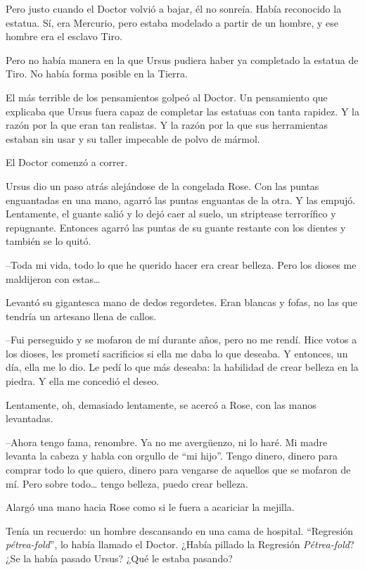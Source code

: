 Pero justo cuando el Doctor volvió a bajar, él no sonreía. Había
reconocido la estatua. Sí, era Mercurio, pero estaba modelado a partir
de un hombre, y ese hombre era el esclavo Tiro.

Pero no había manera en la que Ursus pudiera haber ya completado la
estatua de Tiro. No había forma posible en la Tierra.

El más terrible de los pensamientos golpeó al Doctor. Un pensamiento que
explicaba que Ursus fuera capaz de completar las estatuas con tanta
rapidez. Y la razón por la que eran tan realistas. Y la razón por la que
sus herramientas estaban sin usar y su taller impecable de polvo de
mármol.

El Doctor comenzó a correr.

Ursus dio un paso atrás alejándose de la congelada Rose. Con las puntas
enguantadas en una mano, agarró las puntas enguantas de la otra. Y las
empujó. Lentamente, el guante salió y lo dejó caer al suelo, un
striptease terrorífico y repugnante. Entonces agarró las puntas de su
guante restante con los dientes y también se lo quitó.

--Toda mi vida, todo lo que he querido hacer era crear belleza. Pero los
dioses me maldijeron con estas\ldots{}

Levantó su gigantesca mano de dedos regordetes. Eran blancas y fofas, no
las que tendría un artesano llena de callos.

--Fui perseguido y se mofaron de mí durante años, pero no me rendí. Hice
votos a los dioses, les prometí sacrificios si ella me daba lo que
deseaba. Y entonces, un día, ella me lo dio. Le pedí lo que más deseaba:
la habilidad de crear belleza en la piedra. Y ella me concedió el deseo.

Lentamente, oh, demasiado lentamente, se acercó a Rose, con las manos
levantadas.

--Ahora tengo fama, renombre. Ya no me avergüenzo, ni lo haré. Mi madre
levanta la cabeza y habla con orgullo de ``mi hijo''. Tengo dinero,
dinero para comprar todo lo que quiero, dinero para vengarse de aquellos
que se mofaron de mí. Pero sobre todo\ldots{} tengo belleza, puedo crear
belleza.

Alargó una mano hacia Rose como si le fuera a acariciar la mejilla.

Tenía un recuerdo: un hombre descansando en una cama de hospital.
``Regresión \emph{pétrea-fold}'', lo había llamado el Doctor. ¿Había
pillado la Regresión \emph{Pétrea-fold}? ¿Se la había pasado Ursus? ¿Qué
le estaba pasando?

